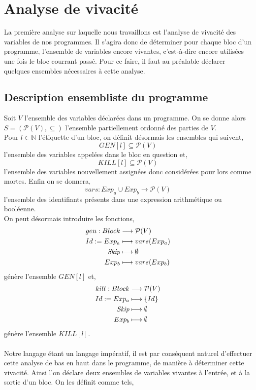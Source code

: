 \documentclass[a4paper, 12pt]{article}
\begin{document}
\section{Analyse de vivacité}
La première analyse sur laquelle nous travaillons est l'analyse de vivacité des variables de nos programmes. 
Il s'agira donc de déterminer pour chaque bloc d'un programme, l'ensemble de variables encore vivantes, c'est-à-dire
encore utilisées une fois le bloc courrant passé. Pour ce faire, il faut au préalable déclarer quelques ensembles 
nécessaires à cette analyse.

\subsection{Description ensembliste du programme}
Soit $V$ l'ensemble des variables déclarées dans un programme. On se donne alors $S = (\mathcal{P}(V), \subseteq)$
l'ensemble partiellement ordonné des parties de $V$.
\\
Pour $l \in \mathbb{N}$ l'étiquette d'un bloc, on définit désormais les ensembles qui suivent,
\[GEN[l] \subseteq \mathcal{P}(V)\]
l'ensemble des variables appelées dans le bloc en question et,
\[KILL[l] \subseteq \mathcal{P}(V)\]
l'ensemble des variables nouvellement assignées donc considérées pour lors comme mortes. Enfin on se donnera,
\[vars : Exp_a \cup Exp_b \longrightarrow \mathcal{P}(V)\]
l'ensemble des identifiants présents dans une expression arithmétique ou booléenne.
\\
On peut désormais introduire les fonctions,
\begin{align*}
	gen : Block &\longrightarrow \mathcal{P}(V)\\
	{Id}\space:=\space{Exp_a} &\longmapsto vars(Exp_a)\\
	\textit{Skip} &\longmapsto \emptyset\\
	Exp_b &\longmapsto vars(Exp_b)
\end{align*}
génère l'ensemble $GEN[l]$ et,
\begin{align*}
	kill : Block &\longrightarrow \mathcal{P}(V)\\
	{Id}\space:=\space{Exp_a} &\longmapsto \{Id\}\\
	\textit{Skip} &\longmapsto \emptyset\\
	Exp_b &\longmapsto \emptyset
\end{align*}
génère l'ensemble $KILL[l]$.
\\
\\
Notre langage étant un langage impératif, il est par conséquent naturel d'effectuer cette analyse de bas en haut dans le programme,
de manière à déterminer cette vivacité. Ainsi l'on déclare deux ensembles de variables vivantes à l'entrée, et à la
sortie d'un bloc. On les définit comme tels,
\end{document}

